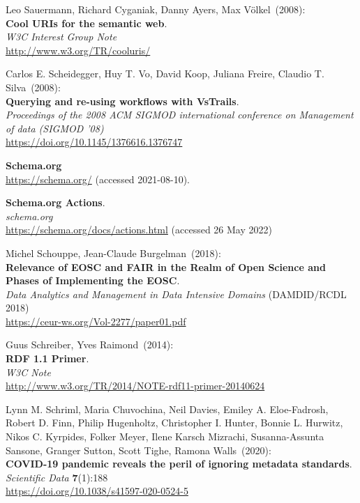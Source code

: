 \begin{thebibliography}{9}
Leo Sauermann, Richard Cyganiak, Danny Ayers, Max Völkel~(2008): \\
\textbf{Cool URIs for the semantic web}.\\
\emph{W3C Interest Group Note}\\
\url{http://www.w3.org/TR/cooluris/}

Carlos E. Scheidegger, Huy T. Vo, David Koop, Juliana Freire, Claudio T. Silva~(2008): \\
\textbf{Querying and re-using workflows with VsTrails}. \\
\emph{Proceedings of the 2008 ACM SIGMOD international conference on Management of data (SIGMOD '08)}\\
\url{https://doi.org/10.1145/1376616.1376747}

\textbf{Schema.org}\\
\url{https://schema.org/} (accessed 2021-08-10).

\textbf{Schema.org {Actions}}.\\
\emph{schema.org}\\
\url{https://schema.org/docs/actions.html} (accessed 26 May 2022)

Michel Schouppe, Jean-Claude Burgelman~(2018): \\
\textbf{Relevance of EOSC and FAIR in the Realm of Open Science and Phases of Implementing the EOSC}.\\
\emph{Data Analytics and Management in Data Intensive Domains} (DAMDID/RCDL 2018)\\
\url{https://ceur-ws.org/Vol-2277/paper01.pdf}

Guus Schreiber, Yves Raimond~(2014): \\
\textbf{RDF 1.1 Primer}. \\
\emph{W3C Note} \\
\url{http://www.w3.org/TR/2014/NOTE-rdf11-primer-20140624}

Lynn M. Schriml, Maria Chuvochina, Neil Davies, Emiley A. Eloe-Fadrosh, Robert D. Finn, Philip Hugenholtz, Christopher I. Hunter, Bonnie L. Hurwitz, Nikos C. Kyrpides, Folker Meyer, Ilene Karsch Mizrachi, Susanna-Assunta Sansone, Granger Sutton, Scott Tighe, Ramona Walls~(2020): \\
\textbf{COVID-19 pandemic reveals the peril of ignoring metadata standards}.\\
\emph{Scientific Data} \textbf{7}(1):188\\
\url{https://doi.org/10.1038/s41597-020-0524-5}


\end{thebibliography}
